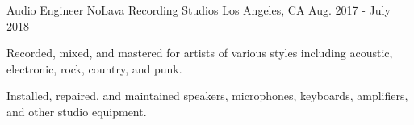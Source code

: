 \begin{cventries}

  \cventry
    {Audio Engineer} %
    {NoLava Recording Studios} %
    {Los Angeles, CA} %
    {Aug. 2017 - July 2018} %
    {
      \begin{cvitems} %
        \item {Recorded, mixed, and mastered for artists of various styles including acoustic, electronic, rock, country, and punk.}
        \item {Installed, repaired, and maintained speakers, microphones, keyboards, amplifiers, and other studio equipment.}
      \end{cvitems}
    }

\end{cventries}
